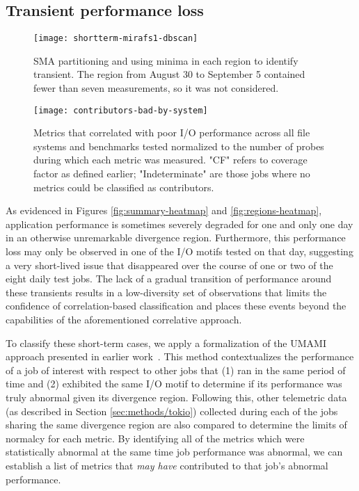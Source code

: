 \subsection{Transient performance loss} \label{sec:results/shortterm}

\begin{figure}
    \centering
    \texttt{[image: shortterm-mirafs1-dbscan]}
    \vspace{-.35in}
    \caption{SMA partitioning and using minima in each region to identify transient.  The region from August 30 to September 5 contained fewer than seven measurements, so it was not considered.}
    \label{fig:shortterm-mirafs1-dbscan}
\end{figure}

\begin{figure}
    \centering
    \texttt{[image: contributors-bad-by-system]}
    \vspace{-.35in}
    \caption{Metrics that correlated with poor I/O performance across all file systems and benchmarks tested normalized to the number of probes during which each metric was measured.
    "CF" refers to coverage factor as defined earlier;
    "Indeterminate" are those jobs where no metrics could be classified as contributors.
    }
    \label{fig:contributors-bad-by-system}
\end{figure}

As evidenced in Figures \ref{fig:summary-heatmap} and \ref{fig:regions-heatmap}, application performance is sometimes severely degraded for one and only one day in an otherwise unremarkable divergence region.
Furthermore, this performance loss may only be observed in one of the I/O motifs tested on that day, suggesting a very short-lived issue that disappeared over the course of one or two of the eight daily test jobs.
The lack of a gradual transition of performance around these transients results in a low-diversity set of observations that limits the confidence of correlation-based classification and places these events beyond the capabilities of the aforementioned correlative approach.

To classify these short-term cases, we apply a formalization of the UMAMI approach presented in earlier work~\cite{Lockwood2017}.
This method contextualizes the performance of a job of interest with respect to other jobs that (1) ran in the same period of time and (2) exhibited the same I/O motif to determine if its performance was truly abnormal given its divergence region.
Following this, other telemetric data (as described in Section \ref{sec:methods/tokio}) collected during each of the jobs sharing the same divergence region are also compared to determine the limits of normalcy for each metric.
By identifying all of the metrics which were statistically abnormal at the same time job performance was abnormal, we can establish a list of metrics that \emph{may have} contributed to that job's abnormal performance.

